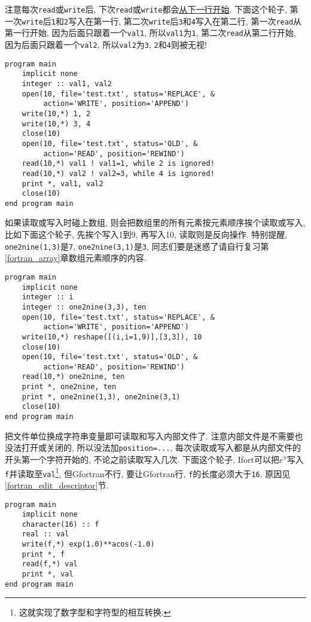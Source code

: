 注意每次\verb|read|或\verb|write|后, 下次\verb|read|或\verb|write|都会\uline{从下一行开始}. 下面这个轮子, 第一次\verb|write|后\verb|1|和\verb|2|写入在第一行, 第二次\verb|write|后\verb|3|和\verb|4|写入在第二行, 第一次\verb|read|从第一行开始, 因为后面只跟着一个\verb|val1|, 所以\verb|val1|为\verb|1|, 第二次\verb|read|从第二行开始, 因为后面只跟着一个\verb|val2|, 所以\verb|val2|为\verb|3|, \verb|2|和\verb|4|则被无视!
\begin{verbatim}
program main
    implicit none
    integer :: val1, val2
    open(10, file='test.txt', status='REPLACE', &
         action='WRITE', position='APPEND')
    write(10,*) 1, 2
    write(10,*) 3, 4
    close(10)
    open(10, file='test.txt', status='OLD', &
         action='READ', position='REWIND')
    read(10,*) val1 ! val1=1, while 2 is ignored!
    read(10,*) val2 ! val2=3, while 4 is ignored!
    print *, val1, val2
    close(10)
end program main
\end{verbatim}

如果读取或写入时碰上数组, 则会把数组里的所有元素按元素顺序挨个读取或写入, 比如下面这个轮子, 先挨个写入1到9, 再写入10, 读取则是反向操作. 特别提醒, \verb|one2nine(1,3)|是\verb|7|, \verb|one2nine(3,1)|是\verb|3|, 同志们要是迷惑了请自行复习第\ref{fortran_array}章数组元素顺序的内容.
\begin{verbatim}
program main
    implicit none
    integer :: i
    integer :: one2nine(3,3), ten
    open(10, file='test.txt', status='REPLACE', &
         action='WRITE', position='APPEND')
    write(10,*) reshape([(i,i=1,9)],[3,3]), 10
    close(10)
    open(10, file='test.txt', status='OLD', &
         action='READ', position='REWIND')
    read(10,*) one2nine, ten
    print *, one2nine, ten
    print *, one2nine(1,3), one2nine(3,1)
    close(10)
end program main
\end{verbatim}

把文件单位换成字符串变量即可读取和写入内部文件了. 注意内部文件是不需要也没法打开或关闭的, 所以没法加\verb|position=...|, 每次读取或写入都是从内部文件的开头第一个字符开始的, 不论之前读取写入几次. 下面这个轮子, Ifort可以把$e^\pi$写入\verb|f|并读取至\verb|val|\footnote{这就实现了数字型和字符型的相互转换.}, 但Gfortran不行, 要让Gfortran行, \verb|f|的长度必须大于\verb|16|. 原因见\ref{fortran_edit_descriptor}节.\label{internal_file}
\begin{verbatim}
program main
    implicit none
    character(16) :: f
    real :: val
    write(f,*) exp(1.0)**acos(-1.0)
    print *, f
    read(f,*) val
    print *, val
end program main
\end{verbatim}

